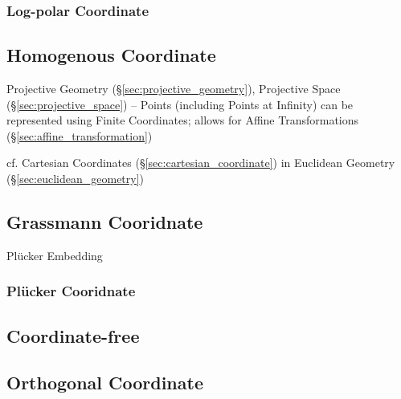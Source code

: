 \subsubsection{Log-polar Coordinate}\label{sec:logpolar_coordinate}



\subsection{Homogenous Coordinate}\label{sec:homogenous_coordinate}

Projective Geometry (\S\ref{sec:projective_geometry}), Projective
Space (\S\ref{sec:projective_space}) -- Points (including Points at
Infinity) can be represented using Finite Coordinates; allows for
Affine Transformations (\S\ref{sec:affine_transformation})

cf. Cartesian Coordinates (\S\ref{sec:cartesian_coordinate}) in
Euclidean Geometry (\S\ref{sec:euclidean_geometry})



\subsection{Grassmann Cooridnate}\label{sec:grassmann_coordinate}

Pl\"ucker Embedding



\subsubsection{Pl\"ucker Cooridnate}\label{sec:plucker_coordinate}



\subsection{Coordinate-free}\label{sec:coordinate_free}

\subsection{Orthogonal Coordinate}\label{sec:orthogonal_coordinate}


